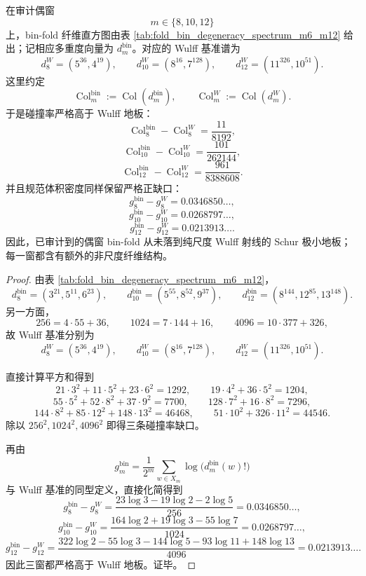 \begin{proposition}\label{prop:xi-time-part9ze-audited-even-window-above-wulff-floor}
在审计偶窗
\[
m\in\{8,10,12\}
\]
上，bin-fold 纤维直方图由表 \ref{tab:fold_bin_degeneracy_spectrum_m6_m12} 给出；记相应多重度向量为 \(d_m^{\mathrm{bin}}\)。对应的 Wulff 基准谱为
\[
d_8^W=(5^{36},4^{19}),
\qquad
d_{10}^W=(8^{16},7^{128}),
\qquad
d_{12}^W=(11^{326},10^{51}).
\]
这里约定
\[
\operatorname{Col}_m^{\mathrm{bin}}:=\operatorname{Col}(d_m^{\mathrm{bin}}),
\qquad
\operatorname{Col}_m^W:=\operatorname{Col}(d_m^W).
\]
于是碰撞率严格高于 Wulff 地板：
\[
\operatorname{Col}_8^{\mathrm{bin}}-\operatorname{Col}_8^W
=\frac{11}{8192},
\]
\[
\operatorname{Col}_{10}^{\mathrm{bin}}-\operatorname{Col}_{10}^W
=\frac{101}{262144},
\]
\[
\operatorname{Col}_{12}^{\mathrm{bin}}-\operatorname{Col}_{12}^W
=\frac{961}{8388608}.
\]
并且规范体积密度同样保留严格正缺口：
\[
g_8^{\mathrm{bin}}-g_8^W=0.0346850\ldots,
\]
\[
g_{10}^{\mathrm{bin}}-g_{10}^W=0.0268797\ldots,
\]
\[
g_{12}^{\mathrm{bin}}-g_{12}^W=0.0213913\ldots.
\]
因此，已审计到的偶窗 bin-fold 从未落到纯尺度 Wulff 射线的 Schur 极小地板；每一窗都含有额外的非尺度纤维结构。
\end{proposition}
\begin{proof}
由表 \ref{tab:fold_bin_degeneracy_spectrum_m6_m12}，
\[
d_8^{\mathrm{bin}}=(3^{21},5^{11},6^{23}),
\qquad
d_{10}^{\mathrm{bin}}=(5^{55},8^{52},9^{37}),
\qquad
d_{12}^{\mathrm{bin}}=(8^{144},12^{85},13^{148}).
\]
另一方面，
\[
256=4\cdot 55+36,
\qquad
1024=7\cdot 144+16,
\qquad
4096=10\cdot 377+326,
\]
故 Wulff 基准分别为
\[
d_8^W=(5^{36},4^{19}),
\qquad
d_{10}^W=(8^{16},7^{128}),
\qquad
d_{12}^W=(11^{326},10^{51}).
\]

直接计算平方和得到
\[
21\cdot 3^2+11\cdot 5^2+23\cdot 6^2=1292,
\qquad
19\cdot 4^2+36\cdot 5^2=1204,
\]
\[
55\cdot 5^2+52\cdot 8^2+37\cdot 9^2=7700,
\qquad
128\cdot 7^2+16\cdot 8^2=7296,
\]
\[
144\cdot 8^2+85\cdot 12^2+148\cdot 13^2=46468,
\qquad
51\cdot 10^2+326\cdot 11^2=44546.
\]
除以 \(256^2,1024^2,4096^2\) 即得三条碰撞率缺口。

再由
\[
g_m^{\mathrm{bin}}=\frac{1}{2^m}\sum_{w\in X_m}\log\bigl(d_m^{\mathrm{bin}}(w)!\bigr)
\]
与 Wulff 基准的同型定义，直接化简得到
\[
g_8^{\mathrm{bin}}-g_8^W
=
\frac{23\log 3-19\log 2-2\log 5}{256}
=0.0346850\ldots,
\]
\[
g_{10}^{\mathrm{bin}}-g_{10}^W
=
\frac{164\log 2+19\log 3-55\log 7}{1024}
=0.0268797\ldots,
\]
\[
g_{12}^{\mathrm{bin}}-g_{12}^W
=
\frac{322\log 2-55\log 3-144\log 5-93\log 11+148\log 13}{4096}
=0.0213913\ldots.
\]
因此三窗都严格高于 Wulff 地板。证毕。
\end{proof}

